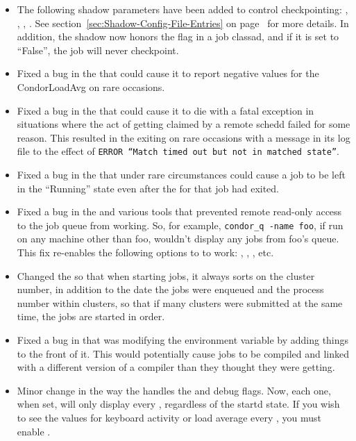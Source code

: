 \begin{itemize}
\item The following shadow parameters have been added to control
checkpointing: ,
, ,
.  See
section~\ref{sec:Shadow-Config-File-Entries} on
page~\pageref{sec:Shadow-Config-File-Entries} for more details.
In addition, the shadow now honors the  flag in a job
classad, and if it is set to ``False'', the job will never
checkpoint.

\item Fixed a bug in the  that could cause it to
report negative values for the CondorLoadAvg on rare occasions. 

\item Fixed a bug in the  that could cause it to die
with a fatal exception in situations where the act of getting claimed
by a remote schedd failed for some reason.  
This resulted in the  exiting on rare occasions with a
message in its log file to the effect of \texttt{ERROR ``Match timed
out but not in matched state''}.

\item Fixed a bug in the  that under rare circumstances
could cause a job to be left in the ``Running'' state even after the
 for that job had exited.

\item Fixed a bug in the  and various tools that
prevented remote read-only access to the job queue from working.
So, for example, \texttt{condor\_q -name foo}, if run on any machine
other than foo, wouldn't display any jobs from foo's queue. 
This fix re-enables the following options to  to work:
, , , etc.

\item Changed the  so that when starting jobs, it
always sorts on the cluster number, in addition to the date the jobs
were enqueued and the process number within clusters, so that if many
clusters were submitted at the same time, the jobs are started in
order.

\item Fixed a bug in  that was modifying the
 environment variable by adding things to the front of it.
This would potentially cause jobs to be compiled and linked with a
different version of a compiler than they thought they were getting.  

\item Minor change in the way the  handles the
 and  debug flags.  
Now, each one, when set, will only display every
, regardless of the startd state.
If you wish to see the values for keyboard activity or load average
every , you must enable . 

\end{itemize}

